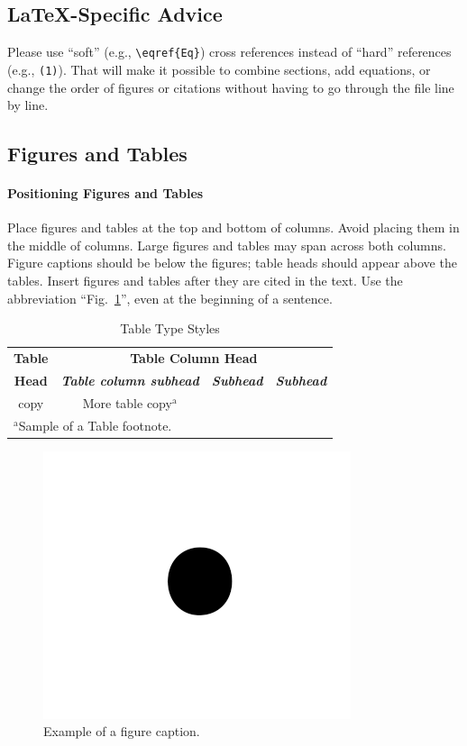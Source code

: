 \documentclass[conference]{IEEEtran}
\begin{document}
\subsection{\LaTeX-Specific Advice}

Please use ``soft'' (e.g., \verb|\eqref{Eq}|) cross references instead
of ``hard'' references (e.g., \verb|(1)|). That will make it possible
to combine sections, add equations, or change the order of figures or
citations without having to go through the file line by line.

\subsection{Figures and Tables}
\paragraph{Positioning Figures and Tables} Place figures and tables at the top and 
bottom of columns. Avoid placing them in the middle of columns. Large 
figures and tables may span across both columns. Figure captions should be 
below the figures; table heads should appear above the tables. Insert 
figures and tables after they are cited in the text. Use the abbreviation 
``Fig.~\ref{fig}'', even at the beginning of a sentence.

\begin{table}[htbp]
\caption{Table Type Styles}
\begin{center}
\begin{tabular}{|c|c|c|c|}
\hline
\textbf{Table}&\multicolumn{3}{|c|}{\textbf{Table Column Head}} \\
\cline{2-4} 
\textbf{Head} & \textbf{\textit{Table column subhead}}& \textbf{\textit{Subhead}}& \textbf{\textit{Subhead}} \\
\hline
copy& More table copy$^{\mathrm{a}}$& &  \\
\hline
\multicolumn{4}{l}{$^{\mathrm{a}}$Sample of a Table footnote.}
\end{tabular}
\label{tab1}
\end{center}
\end{table}

\begin{figure}[htbp]
\centerline{\includegraphics{fig1.png}}
\caption{Example of a figure caption.}
\label{fig}
\end{figure}
\end{document}
